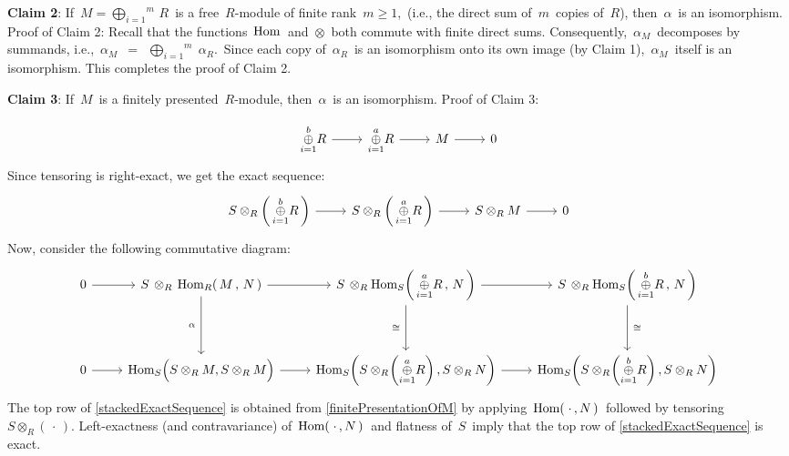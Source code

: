 \begin{enumerate}
	\vskip 0.3cm
	\textbf{Claim 2}:\;\; If \,$M = \overset{m}{\underset{i =1}{\bigoplus}}\, R$\, is a free \,$R$-module of finite rank \,$m \geq 1$,\,
	(i.e., the direct sum of \,$m$\, copies of \,$R$),
	then \,$\alpha$\, is an isomorphism.
	\vskip 0.01cm
	Proof of Claim 2:\;\;
	Recall that the functions \,$\textnormal{Hom}$\, and \,$\otimes$\, both commute with finite direct sums.
	Consequently, \,$\alpha_{M}$\, decomposes by summands, i.e.,
	\,$\alpha_{M}$ \,$=$\, $\overset{m}{\underset{i=1}{\bigoplus}}\;\alpha_{R}$.\,
	Since each copy of \,$\alpha_{R}$\, is an isomorphism onto its own image (by Claim 1),
	\,$\alpha_{M}$\, itself is an isomorphism.
	This completes the proof of Claim 2.

	\vskip 0.3cm
	\textbf{Claim 3}:\;\; If \,$M$\, is a finitely presented \,$R$-module,
	then \,$\alpha$\, is an isomorphism.
	\vskip 0.01cm
	Proof of Claim 3:\;\;

	\begin{equation}\label{finitePresentationOfM}
	\begin{tikzcd}
	\overset{b}{\underset{i=1}{\oplus}}R
		\arrow[r]
	&
	\overset{a}{\underset{i=1}{\oplus}}R
		\arrow[r]
	&
	M
		\arrow[r]
	&
	0
	\end{tikzcd}
	\end{equation}
	Since tensoring is right-exact, we get the exact sequence:
	\begin{equation}\label{STensorFinitePresentationOfM}
	\begin{tikzcd}
	S\otimes_{R}\left(\,\overset{b}{\underset{i=1}{\oplus}}R\,\right)
		\arrow[r]
	&
	S\otimes_{R}\left(\,\overset{a}{\underset{i=1}{\oplus}}R\,\right)
		\arrow[r]
	&
	S\otimes_{R}M
		\arrow[r]
	&
	0
	\end{tikzcd}
	\end{equation}
	Now, consider the following commutative diagram:
	\begin{equation}\label{stackedExactSequence}
	\begin{tikzcd}
	0
		\arrow[r]
	&
	S \,\otimes_{R}\, \Hom_{R}\!\left(\,M\,,\,N\,\right)
		\arrow[dd, swap, "\alpha\;"]
		\arrow[r]
	&
	S \,\otimes_{R} \Hom_{S}\!\left(\,\overset{a}{\underset{i=1}{\oplus}}R\,,\,N\,\right)
		\arrow[dd, swap, "\cong\;"]
		\arrow[r]
	&
	S \,\otimes_{R} \Hom_{S}\!\left(\,\overset{b}{\underset{i=1}{\oplus}}R\,,\,N\,\right)
		\arrow[dd, "\;\cong"]
	\\
	\\
	0
		\arrow[r]
	&
	\Hom_{S}\!\left(\overset{{\color{white}.}}{S} \otimes_{R}M , S \otimes_{R}M\right)
		\arrow[r]
	&
	\Hom_{S}\!\left(\overset{{\color{white}.}}{S}\otimes_{R}\!\left(\overset{a}{\underset{i=1}{\oplus}}R\right),S\otimes_{R}N\right)
		\arrow[r]
	&
	\Hom_{S}\!\left(\overset{{\color{white}.}}{S}\otimes_{R}\!\left(\overset{b}{\underset{i=1}{\oplus}}R\right),S\otimes_{R}N\right)
	\end{tikzcd}
	\end{equation}
	The top row of  \eqref{stackedExactSequence} is obtained from \eqref{finitePresentationOfM}
	by applying \,$\textnormal{Hom}(\;\cdot\,,N\,)$\, followed by tensoring \,$S\otimes_{R}(\,\cdot\,)$.
	Left-exactness (and contravariance) of \,$\textnormal{Hom}(\;\cdot\,,N\,)$\,
	and flatness of \,$S$\ imply that the top row of \eqref{stackedExactSequence} is exact.


\end{enumerate}
